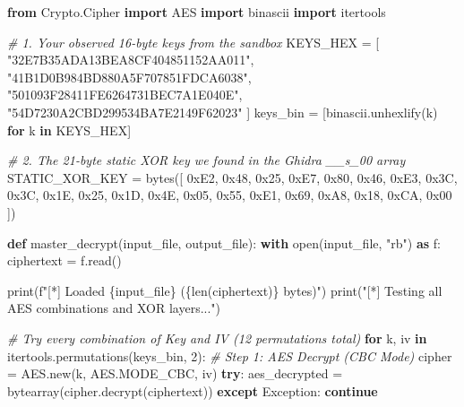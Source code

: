 \documentclass[
]{article}
\newenvironment{Shaded}{}{}
\newcommand{\BaseNTok}[1]{\textcolor[rgb]{0.25,0.63,0.44}{#1}}
\newcommand{\BuiltInTok}[1]{\textcolor[rgb]{0.00,0.50,0.00}{#1}}
\newcommand{\CommentTok}[1]{\textcolor[rgb]{0.38,0.63,0.69}{\textit{#1}}}
\newcommand{\ControlFlowTok}[1]{\textcolor[rgb]{0.00,0.44,0.13}{\textbf{#1}}}
\newcommand{\DecValTok}[1]{\textcolor[rgb]{0.25,0.63,0.44}{#1}}
\newcommand{\ImportTok}[1]{\textcolor[rgb]{0.00,0.50,0.00}{\textbf{#1}}}
\newcommand{\KeywordTok}[1]{\textcolor[rgb]{0.00,0.44,0.13}{\textbf{#1}}}
\newcommand{\NormalTok}[1]{#1}
\newcommand{\OperatorTok}[1]{\textcolor[rgb]{0.40,0.40,0.40}{#1}}
\newcommand{\PreprocessorTok}[1]{\textcolor[rgb]{0.74,0.48,0.00}{#1}}
\newcommand{\SpecialCharTok}[1]{\textcolor[rgb]{0.25,0.44,0.63}{#1}}
\newcommand{\SpecialStringTok}[1]{\textcolor[rgb]{0.73,0.40,0.53}{#1}}
\newcommand{\StringTok}[1]{\textcolor[rgb]{0.25,0.44,0.63}{#1}}
\begin{document}
\begin{Shaded}
\begin{Highlighting}[]
\ImportTok{from}\NormalTok{ Crypto.Cipher }\ImportTok{import}\NormalTok{ AES}
\ImportTok{import}\NormalTok{ binascii}
\ImportTok{import}\NormalTok{ itertools}

\CommentTok{\# 1. Your observed 16{-}byte keys from the sandbox}
\NormalTok{KEYS\_HEX }\OperatorTok{=}\NormalTok{ [}
    \StringTok{"32E7B35ADA13BEA8CF404851152AA011"}\NormalTok{,}
    \StringTok{"41B1D0B984BD880A5F707851FDCA6038"}\NormalTok{,}
    \StringTok{"501093F28411FE6264731BEC7A1E040E"}\NormalTok{,}
    \StringTok{"54D7230A2CBD299534BA7E2149F62023"}
\NormalTok{]}
\NormalTok{keys\_bin }\OperatorTok{=}\NormalTok{ [binascii.unhexlify(k) }\ControlFlowTok{for}\NormalTok{ k }\KeywordTok{in}\NormalTok{ KEYS\_HEX]}

\CommentTok{\# 2. The 21{-}byte static XOR key we found in the Ghidra \_\_s\_00 array}
\NormalTok{STATIC\_XOR\_KEY }\OperatorTok{=} \BuiltInTok{bytes}\NormalTok{([}
    \BaseNTok{0xE2}\NormalTok{, }\BaseNTok{0x48}\NormalTok{, }\BaseNTok{0x25}\NormalTok{, }\BaseNTok{0xE7}\NormalTok{, }\BaseNTok{0x80}\NormalTok{, }\BaseNTok{0x46}\NormalTok{, }\BaseNTok{0xE3}\NormalTok{, }\BaseNTok{0x3C}\NormalTok{,}
    \BaseNTok{0x3C}\NormalTok{, }\BaseNTok{0x1E}\NormalTok{, }\BaseNTok{0x25}\NormalTok{, }\BaseNTok{0x1D}\NormalTok{, }\BaseNTok{0x4E}\NormalTok{, }\BaseNTok{0x05}\NormalTok{, }\BaseNTok{0x55}\NormalTok{, }\BaseNTok{0xE1}\NormalTok{,}
    \BaseNTok{0x69}\NormalTok{, }\BaseNTok{0xA8}\NormalTok{, }\BaseNTok{0x18}\NormalTok{, }\BaseNTok{0xCA}\NormalTok{, }\BaseNTok{0x00}
\NormalTok{])}

\KeywordTok{def}\NormalTok{ master\_decrypt(input\_file, output\_file):}
    \ControlFlowTok{with} \BuiltInTok{open}\NormalTok{(input\_file, }\StringTok{"rb"}\NormalTok{) }\ImportTok{as}\NormalTok{ f:}
\NormalTok{        ciphertext }\OperatorTok{=}\NormalTok{ f.read()}

    \BuiltInTok{print}\NormalTok{(}\SpecialStringTok{f"[*] Loaded }\SpecialCharTok{\{}\NormalTok{input\_file}\SpecialCharTok{\}}\SpecialStringTok{ (}\SpecialCharTok{\{}\BuiltInTok{len}\NormalTok{(ciphertext)}\SpecialCharTok{\}}\SpecialStringTok{ bytes)"}\NormalTok{)}
    \BuiltInTok{print}\NormalTok{(}\StringTok{"[*] Testing all AES combinations and XOR layers..."}\NormalTok{)}

    \CommentTok{\# Try every combination of Key and IV (12 permutations total)}
    \ControlFlowTok{for}\NormalTok{ k, iv }\KeywordTok{in}\NormalTok{ itertools.permutations(keys\_bin, }\DecValTok{2}\NormalTok{):}
        \CommentTok{\# Step 1: AES Decrypt (CBC Mode)}
\NormalTok{        cipher }\OperatorTok{=}\NormalTok{ AES.new(k, AES.MODE\_CBC, iv)}
        \ControlFlowTok{try}\NormalTok{:}
\NormalTok{            aes\_decrypted }\OperatorTok{=} \BuiltInTok{bytearray}\NormalTok{(cipher.decrypt(ciphertext))}
        \ControlFlowTok{except} \PreprocessorTok{Exception}\NormalTok{:}
            \ControlFlowTok{continue}


\end{Highlighting}
\end{Shaded}
\end{document}
